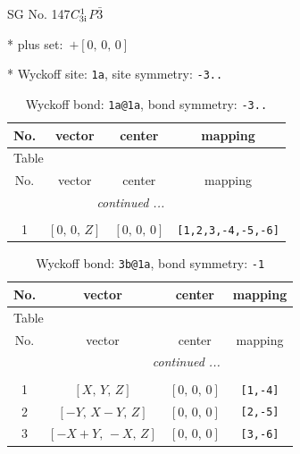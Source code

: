 \documentclass[fleqn,8pt]{jsarticle}
\begin{document}
\setcounter{MaxMatrixCols}{32}

\renewcommand{\tablename}{Table~}
\renewcommand{\figurename}{Figure~}
\begin{center}
\LARGE
SG No. 147\quad$C_{\rm 3i}^{1}$\quad$P\bar{3}$\quad[ trigonal ]
\end{center}

* plus set:\,\,\,$+\left[ 0,\, 0,\, 0 \right]$


* Wyckoff site: {\tt 1a}, site symmetry: {\tt -3..}
\renewcommand{\arraystretch}{1.2}
\begin{longtable}{cccc}
\caption{Wyckoff bond: {\tt 1a@1a}, bond symmetry: {\tt -3..}}
 \\
 \hline \hline
No. & vector & center & mapping \\ \hline \endfirsthead

\multicolumn{3}{l}{\tablename\ \thetable{}} \\
 \hline \hline
No. & vector & center & mapping \\ \hline \endhead

 \hline \hline
\multicolumn{3}{r}{\footnotesize\it continued ...} \\ \endfoot

 \hline \hline
\multicolumn{3}{r}{} \\ \endlastfoot

1 & $\left[ 0,\, 0,\, Z \right]$ & $\left[ 0,\, 0,\, 0 \right]$ & {\tt [1,2,3,-4,-5,-6]} \\
\end{longtable}
\renewcommand{\arraystretch}{1.2}
\begin{longtable}{cccc}
\caption{Wyckoff bond: {\tt 3b@1a}, bond symmetry: {\tt -1}}
 \\
 \hline \hline
No. & vector & center & mapping \\ \hline \endfirsthead

\multicolumn{3}{l}{\tablename\ \thetable{}} \\
 \hline \hline
No. & vector & center & mapping \\ \hline \endhead

 \hline \hline
\multicolumn{3}{r}{\footnotesize\it continued ...} \\ \endfoot

 \hline \hline
\multicolumn{3}{r}{} \\ \endlastfoot

1 & $\left[ X,\, Y,\, Z \right]$ & $\left[ 0,\, 0,\, 0 \right]$ & {\tt [1,-4]} \\ \hline
2 & $\left[ - Y,\, X - Y,\, Z \right]$ & $\left[ 0,\, 0,\, 0 \right]$ & {\tt [2,-5]} \\ \hline
3 & $\left[ - X + Y,\, - X,\, Z \right]$ & $\left[ 0,\, 0,\, 0 \right]$ & {\tt [3,-6]} \\
\end{longtable}
\end{document}
